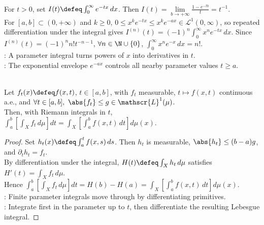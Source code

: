 \begin{example} \label{ex:laplace-transform-powers-factorials} \\
For $t>0$, set $I(t)\defeq\int_0^\infty e^{-tx}\,dx$. Then $I(t)=\lim\limits_{b\to+\infty}\frac{1-e^{-tb}}{t}=t^{-1}$.\\
For $[a,b]\subset(0,+\infty)$ and $k\geq0$, $0\leq x^ke^{-tx}\leq x^ke^{-ax}\in\mathscr{L}^1(0,\infty)$, so repeated differentiation under the integral gives $I^{(n)}(t)=(-1)^n\int_0^\infty x^ne^{-tx}\,dx$. Since $I^{(n)}(t)=(-1)^nn!t^{-n-1}$, $\forall n\in\N\cup\{0\}$, $\int_0^\infty x^ne^{-x}\,dx=n!$.\\
: A parameter integral turns powers of $x$ into derivatives in $t$.\\
: The exponential envelope $e^{-ax}$ controls all nearby parameter values $t\geq a$.
\end{example}

\begin{corollary} \label{cor:riemann-parameter-integral-interchange} \\
Let $f_t(x)\defeq f(x,t)$, $t\in[a,b]$, with $f_t$ measurable, $t\mapsto f(x,t)$ continuous a.e., and $\forall t\in[a,b],\ \abs{f_t}\leq g\in\mathscr{L}^1(\mu)$.\\
Then, with Riemann integrals in $t$, $\int_a^b\left[\int_X f_t\,d\mu\right]dt =\int_X\left[\int_a^b f(x,t)\,dt\right]d\mu(x)$.
\begin{proof}
Set $h_t(x)\defeq\int_a^t f(x,s)\,ds$. Then $h_t$ is measurable, $\abs{h_t}\leq(b-a)g$, and $\partial_th_t=f_t$.\\
By differentiation under the integral, $H(t)\defeq\int_Xh_t\,d\mu$ satisfies $H'(t)=\int_Xf_t\,d\mu$.\\
Hence $\int_a^b\left[\int_Xf_t\,d\mu\right]dt=H(b)-H(a)=\int_X\left[\int_a^b f(x,t)\,dt\right]d\mu(x)$.\\
: Finite parameter integrals move through by differentiating primitives.\\
: Integrate first in the parameter up to $t$, then differentiate the resulting Lebesgue integral.
\end{proof}
\end{corollary}

